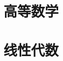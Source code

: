 \documentclass[oneside, onecolumn]{ctexbook}
\begin{document}
	
	\tableofcontents
	\part{高等数学}
	
	\part{线性代数}
	
\end{document}
